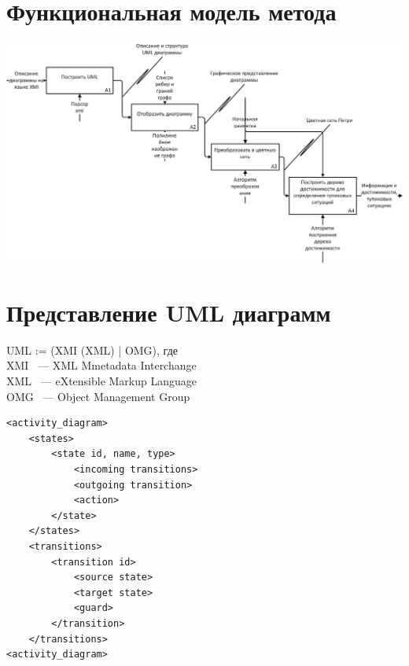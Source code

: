 \documentclass[12pt]{article}
\begin{document}
\section{Функциональная модель метода}

\begin{center}
\includegraphics[width=\textwidth]{../tex/include/IDEF0.png}
\end{center}

\section{Представление UML диаграмм }

\begin{minipage}[H]{0.48\linewidth}
UML := (XMI (XML) | OMG), где \\
XMI ~--- XML Mmetadata Interchange \\
XML ~--- eXtensible Markup Language \\
OMG ~--- Object Management Group

\end{minipage}
\hfill
\begin{minipage}[H]{0.55\linewidth}
	\begin{small}
		\begin{verbatim}
<activity_diagram>
    <states>
        <state id, name, type>
            <incoming transitions>
            <outgoing transition>
            <action>
        </state>
    </states>
    <transitions>
        <transition id>
            <source state>
            <target state>
            <guard>
        </transition>
    </transitions>
<activity_diagram>
		\end{verbatim}
	\end{small}
\end{minipage}
\end{document}
